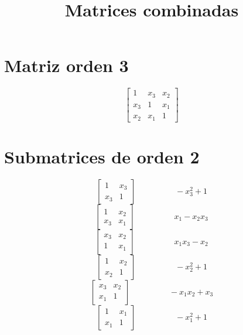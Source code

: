 \documentclass[12pt]{article}
\begin{document}
\title{Matrices combinadas}
\maketitle

\section*{Matriz orden 3}

$$\left[\begin{matrix}1 & x_{3} & x_{2}\\x_{3} & 1 & x_{1}\\x_{2} & x_{1} & 1\end{matrix}\right]$$

\section*{Submatrices de orden 2}


$$\left[\begin{matrix}1 & x_{3}\\x_{3} & 1\end{matrix}\right] \hspace{2cm} - x_{3}^{2} + 1$$
$$\left[\begin{matrix}1 & x_{2}\\x_{3} & x_{1}\end{matrix}\right] \hspace{2cm} x_{1} - x_{2} x_{3}$$
$$\left[\begin{matrix}x_{3} & x_{2}\\1 & x_{1}\end{matrix}\right] \hspace{2cm} x_{1} x_{3} - x_{2}$$
$$\left[\begin{matrix}1 & x_{2}\\x_{2} & 1\end{matrix}\right] \hspace{2cm} - x_{2}^{2} + 1$$
$$\left[\begin{matrix}x_{3} & x_{2}\\x_{1} & 1\end{matrix}\right] \hspace{2cm} - x_{1} x_{2} + x_{3}$$
$$\left[\begin{matrix}1 & x_{1}\\x_{1} & 1\end{matrix}\right] \hspace{2cm} - x_{1}^{2} + 1$$
\end{document}
